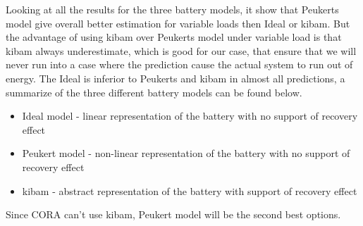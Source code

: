 Looking at all the results for the three battery models, it show that Peukerts model give overall better estimation for variable loads then Ideal or \gls{kibam}. But the advantage of using \gls{kibam} over Peukerts model under variable load is that \gls{kibam} always underestimate, which is good for our case, that ensure that we will never run into a case where the prediction cause the actual system to run out of energy. The Ideal is inferior to Peukerts and \gls{kibam} in almost all predictions, a summarize of the three different battery models can be found below.
\begin{itemize}
	\item Ideal model - linear representation of the battery with no support of recovery effect
	\item Peukert model - non-linear representation of the battery with no support of recovery effect
	\item \gls{kibam} - abstract representation of the battery with support of recovery effect
\end{itemize}
Since CORA can't use \gls{kibam}, Peukert model will be the second best options.





